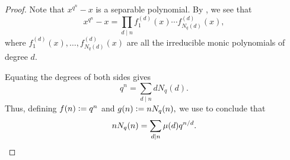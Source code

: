 \gaussnecklace*\label{thm:gaussnecklace2}
\begin{flushright}\hyperref[thm:gaussnecklace]{\upsym}\end{flushright}
\begin{proof}
    Note that $x^{q^n} - x$ is a separable polynomial. By , we see that
    \begin{equation*} 
        x^{q^n} - x = \prod_{d \mid n} f_1^{(d)}(x) \cdots f_{N_q(d)}^{(d)}(x),
    \end{equation*}
    where $f_1^{(d)}(x), \ldots, f_{N_q(d)}^{(d)}(x)$ are all the irreducible monic polynomials of degree $d.$ 

    Equating the degrees of both sides gives
    \begin{equation*} 
        q^n = \sum_{d \mid n} d{N_q(d)}.
    \end{equation*}
    Thus, defining $f(n) \vcentcolon= q^n$ and $g(n) \vcentcolon= nN_q(n),$ we use  to conclude that
    \begin{equation*} 
        nN_q(n) = \sum_{d \mid n} \mu(d)q^{n/d}. \qedhere
    \end{equation*}
\end{proof}


